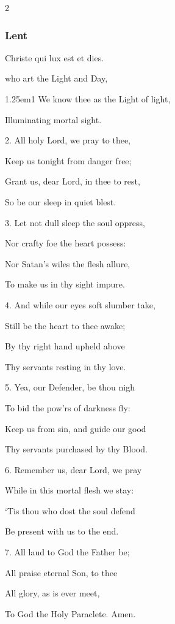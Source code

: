 \begin{multicols}{2}
\subsubsection{Lent}

\vspace{-0.35\baselineskip}

\begin{inhead}
	Christe qui lux est et dies.
\end{inhead}
 who art the Light and Day,\par
{}
\begin{hangparas}{1.25em}{1}
We know thee as the Light of light,\par
Illuminating mortal sight.\\
\par
2. All holy Lord, we pray to thee,\par
Keep us tonight from danger free;\par
Grant us, dear Lord, in thee to rest,\par
So be our sleep in quiet blest.\\
\par
3. Let not dull sleep the soul oppress,\par
Nor crafty foe the heart possess:\par
Nor Satan’s wiles the flesh allure,\par
To make us in thy sight impure.\\
\par
4. And while our eyes soft slumber take,\par
Still be the heart to thee awake;\par
By thy right hand upheld above\par
Thy servants resting in thy love.\\
\par
5. Yea, our Defender, be thou nigh\par
To bid the pow'rs of darkness fly:\par
Keep us from sin, and guide our good\par
Thy servants purchased by thy Blood.\\
\par
6. Remember us, dear Lord, we pray\par
While in this mortal flesh we stay:\par
‘Tis thou who dost the soul defend\par
Be present with us to the end.\\
\par
7. All laud to God the Father be;\par
All praise eternal Son, to thee\par
All glory, as is ever meet,\par
To God the Holy Paraclete. Amen.
\end{hangparas}


\end{multicols}
